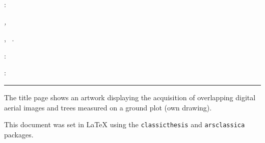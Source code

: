 \thispagestyle{empty}

\hfill

\vfill

\noindent\myName: 
\begin{addmargin}[0cm]{1cm}
\textit{\myTitle,} 
\end{addmargin}
\mySubTitle, \textcopyright\ \myTime.


\medskip
{}: \\

\medskip
{}: \\
\mySupervisor

\vspace{1cm}
\hrule
\bigskip

\noindent The title page shows an artwork displaying the acquisition of overlapping digital aerial images 
and trees measured on a ground plot (own drawing).

\medskip
\noindent This document was set in \LaTeX{} using the \texttt{classicthesis} and \texttt{arsclassica} packages.

